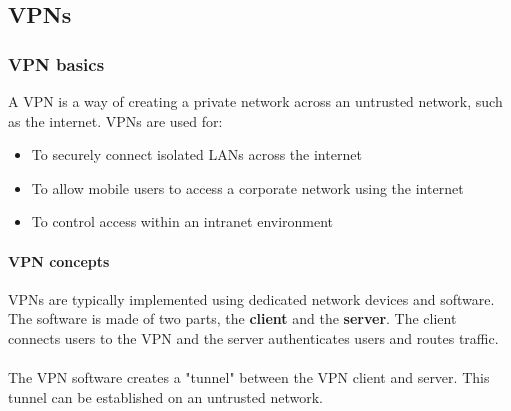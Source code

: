 \documentclass{article}[18pt]
\begin{document}
\subsection{VPNs}
\subsubsection{VPN basics}
A VPN is a way of creating a private network across an untrusted network, such as the internet.
VPNs are used for:
\begin{itemize}
\item To securely connect isolated LANs across the internet
\item To allow mobile users to access a corporate network using the internet
\item To control access within an intranet environment
\end{itemize}
\paragraph{VPN concepts}
VPNs are typically implemented using dedicated network devices and software. The software is made of two parts, the \textbf{client} and the \textbf{server}. The client connects users to the VPN and the server authenticates users and routes traffic.\\
\\
The VPN software creates a "tunnel" between the VPN client and server. This tunnel can be established on an untrusted network.
\end{document}
